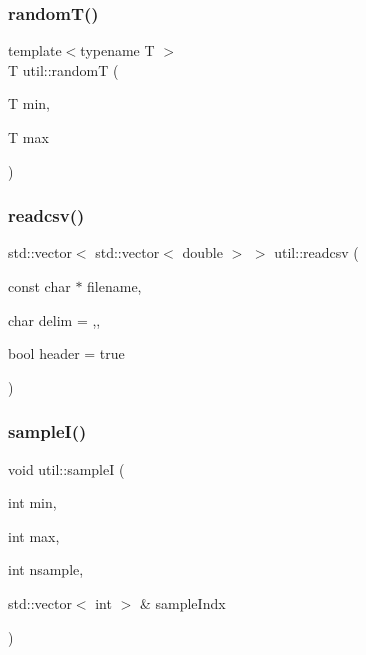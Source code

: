 \mbox{\label{namespaceutil_a254d46b3ebe9a685b6e0eca9db9d51ec}} 
\subsubsection{\texorpdfstring{random\+T()}{randomT()}}
{\footnotesize\ttfamily template$<$typename T $>$ \\
T util\+::randomT (\begin{DoxyParamCaption}\item[{T}]{min,  }\item[{T}]{max }\end{DoxyParamCaption})}

\mbox{\label{namespaceutil_a84b10f9fb76cc3f825e8c680ca7d786e}} 
\subsubsection{\texorpdfstring{readcsv()}{readcsv()}}
{\footnotesize\ttfamily std\+::vector$<$ std\+::vector$<$ double $>$ $>$ util\+::readcsv (\begin{DoxyParamCaption}\item[{const char $\ast$}]{filename,  }\item[{char}]{delim = {\ttfamily \textquotesingle{},\textquotesingle{}},  }\item[{bool}]{header = {\ttfamily true} }\end{DoxyParamCaption})}

\mbox{\label{namespaceutil_a077f5faad89062a4013dc98fc85b7a40}} 
\subsubsection{\texorpdfstring{sample\+I()}{sampleI()}\hspace{0.1cm}{\footnotesize\ttfamily [1/2]}}
{\footnotesize\ttfamily void util\+::sampleI (\begin{DoxyParamCaption}\item[{int}]{min,  }\item[{int}]{max,  }\item[{int}]{nsample,  }\item[{std\+::vector$<$ int $>$ \&}]{sample\+Indx }\end{DoxyParamCaption})}

